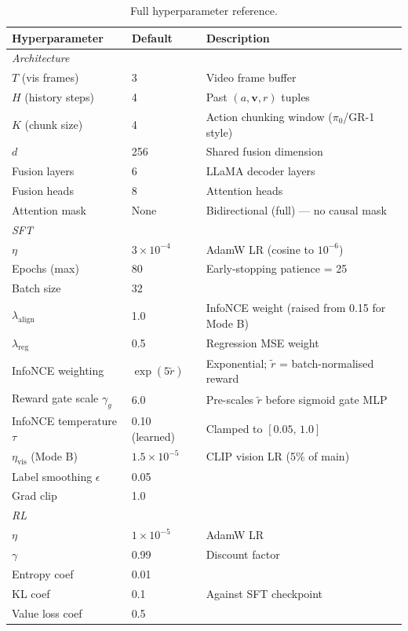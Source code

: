\documentclass{article}
\begin{document}
\begin{table}[h]
\centering
\caption{Full hyperparameter reference.}
\label{tab:hparams}
\small
\begin{tabular}{lll}
\toprule
\textbf{Hyperparameter} & \textbf{Default} & \textbf{Description} \\
\midrule
\multicolumn{3}{l}{\textit{Architecture}} \\
$T$ (vis frames)        & 3     & Video frame buffer \\
$H$ (history steps)     & 4     & Past $(a,\mathbf{v},r)$ tuples \\
$K$ (chunk size)        & 4     & Action chunking window ($\pi_0$/GR-1 style) \\
$d$                     & 256   & Shared fusion dimension \\
Fusion layers           & 6     & LLaMA decoder layers \\
Fusion heads            & 8     & Attention heads \\
Attention mask          & None  & Bidirectional (full) — no causal mask \\
\midrule
\multicolumn{3}{l}{\textit{SFT}} \\
$\eta$                  & $3\!\times\!10^{-4}$ & AdamW LR (cosine to $10^{-6}$) \\
Epochs (max)            & 80    & Early-stopping patience = 25 \\
Batch size              & 32    & \\
$\lambda_\mathrm{align}$& 1.0   & InfoNCE weight (raised from 0.15 for Mode B) \\
$\lambda_\mathrm{reg}$  & 0.5   & Regression MSE weight \\
InfoNCE weighting       & $\exp(5\tilde{r})$ & Exponential; $\tilde{r}$ = batch-normalised reward \\
Reward gate scale $\gamma_g$ & 6.0 & Pre-scales $\tilde{r}$ before sigmoid gate MLP \\
InfoNCE temperature $\tau$ & 0.10 (learned) & Clamped to $[0.05,\,1.0]$ \\
$\eta_\mathrm{vis}$ (Mode B) & $1.5\!\times\!10^{-5}$ & CLIP vision LR (5\% of main) \\
Label smoothing $\epsilon$ & 0.05 & \\
Grad clip               & 1.0   & \\
\midrule
\multicolumn{3}{l}{\textit{RL}} \\
$\eta$                  & $1\!\times\!10^{-5}$ & AdamW LR \\
$\gamma$                & 0.99  & Discount factor \\
Entropy coef            & 0.01  & \\
KL coef                 & 0.1   & Against SFT checkpoint \\
Value loss coef         & 0.5   & \\
\bottomrule
\end{tabular}
\end{table}
\end{document}
